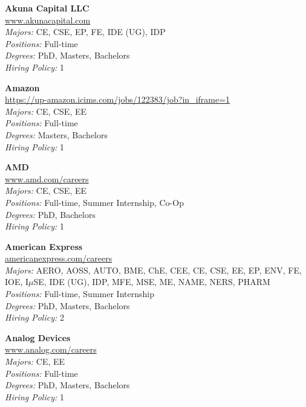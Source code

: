 \documentclass{article}
\begin{document}
\begin{center}
\begin{multicols}{3}
\begin{minipage}{.9\columnwidth}{\Large\bf Akuna Capital LLC }\\
	\url{www.akunacapital.com}\\
	\emph{Majors:} CE, CSE, EP, FE, IDE (UG), IDP\\
	\emph{Positions:} Full-time\\
	\emph{Degrees:} PhD, Masters, Bachelors\\
	\emph{Hiring Policy:} 1\\
\end{minipage}
 
\begin{minipage}{.9\columnwidth}{\Large\bf Amazon }\\
	\url{https://up-amazon.icims.com/jobs/122383/job?in_iframe=1}\\
	\emph{Majors:} CE, CSE, EE\\
	\emph{Positions:} Full-time\\
	\emph{Degrees:} Masters, Bachelors\\
	\emph{Hiring Policy:} 1\\
\end{minipage}
 
\begin{minipage}{.9\columnwidth}{\Large\bf AMD }\\
	\url{www.amd.com/careers}\\
	\emph{Majors:} CE, CSE, EE\\
	\emph{Positions:} Full-time, Summer Internship, Co-Op\\
	\emph{Degrees:} PhD, Bachelors\\
	\emph{Hiring Policy:} 1\\
\end{minipage}
 
\begin{minipage}{.9\columnwidth}{\Large\bf American Express }\\
	\url{americanexpress.com/careers}\\
	\emph{Majors:} AERO, AOSS, AUTO, BME, ChE, CEE, CE, CSE, EE, EP, ENV, FE, IOE, I$\mu$SE, IDE (UG), IDP, MFE, MSE, ME, NAME, NERS, PHARM\\
	\emph{Positions:} Full-time, Summer Internship\\
	\emph{Degrees:} PhD, Masters, Bachelors\\
	\emph{Hiring Policy:} 2\\
\end{minipage}
 
\begin{minipage}{.9\columnwidth}{\Large\bf Analog Devices }\\
	\url{www.analog.com/careers}\\
	\emph{Majors:} CE, EE\\
	\emph{Positions:} Full-time\\
	\emph{Degrees:} PhD, Masters, Bachelors\\
	\emph{Hiring Policy:} 1\\
\end{minipage}
 

\end{multicols}
\end{center}
\end{document}
